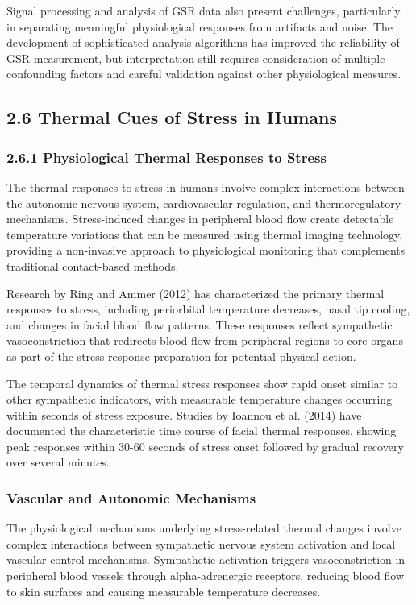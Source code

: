 \documentclass[12pt,a4paper]{article}
\begin{document}
Signal processing and analysis of GSR data also present challenges, particularly in separating meaningful physiological
responses from artifacts and noise. The development of sophisticated analysis algorithms has improved the reliability of
GSR measurement, but interpretation still requires consideration of multiple confounding factors and careful validation
against other physiological measures.

\subsection{2.6 Thermal Cues of Stress in Humans}

\subsubsection{2.6.1 Physiological Thermal Responses to Stress}

The thermal responses to stress in humans involve complex interactions between the autonomic nervous system,
cardiovascular regulation, and thermoregulatory mechanisms. Stress-induced changes in peripheral blood flow create
detectable temperature variations that can be measured using thermal imaging technology, providing a non-invasive
approach to physiological monitoring that complements traditional contact-based methods.

Research by Ring and Ammer (2012) has characterized the primary thermal responses to stress, including periorbital
temperature decreases, nasal tip cooling, and changes in facial blood flow patterns. These responses reflect sympathetic
vasoconstriction that redirects blood flow from peripheral regions to core organs as part of the stress response
preparation for potential physical action.

The temporal dynamics of thermal stress responses show rapid onset similar to other sympathetic indicators, with
measurable temperature changes occurring within seconds of stress exposure. Studies by Ioannou et al. (2014) have
documented the characteristic time course of facial thermal responses, showing peak responses within 30-60 seconds of
stress onset followed by gradual recovery over several minutes.

\subsubsection{Vascular and Autonomic Mechanisms}

The physiological mechanisms underlying stress-related thermal changes involve complex interactions between sympathetic
nervous system activation and local vascular control mechanisms. Sympathetic activation triggers vasoconstriction in
peripheral blood vessels through alpha-adrenergic receptors, reducing blood flow to skin surfaces and causing measurable
temperature decreases.
\end{document}

